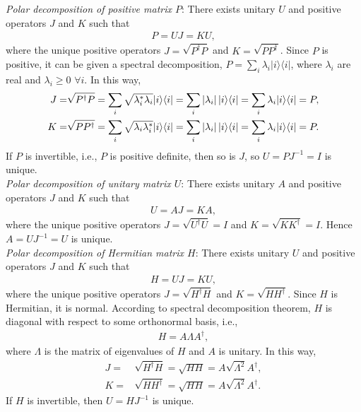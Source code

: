 \documentclass[en]{sol-man}
\begin{document}
\begin{sol}
    \emph{Polar decomposition of positive matrix $P$}: There exists unitary $U$ and positive operators $J$ and $K$ such that
    \begin{align}
        P=UJ=KU,
    \end{align}
    where the unique positive operators $J=\sqrt{P^{\dagger}P}$ and $K=\sqrt{PP^{\dagger}}$. Since $P$ is positive, it can be given a spectral decomposition, $P=\sum_i\lambda_i\lvert i\rangle\langle i\rvert$, where $\lambda_i$ are real and $\lambda_i\geq 0$ $\forall i$. In this way,
    \begin{align}
        J=&\sqrt{P^{\dagger}P}=\sum_i\sqrt{\lambda_i^*\lambda_i}\lvert i\rangle\langle i\rvert=\sum_i\left\lvert\lambda_i\right\rvert\lvert i\rangle\langle i\rvert=\sum_i\lambda_i\lvert i\rangle\langle i\rvert=P,\\
        K=&\sqrt{PP^{\dagger}}=\sum_i\sqrt{\lambda_i\lambda_i^*}\lvert i\rangle\langle i\rvert=\sum_i\left\lvert\lambda_i\right\rvert\lvert i\rangle\langle i\rvert=\sum_i\lambda_i\lvert i\rangle\langle i\rvert=P.
    \end{align}
    If $P$ is invertible, i.e., $P$ is positive definite, then so is $J$, so $U=PJ^{-1}=I$ is unique.\\
    \emph{Polar decomposition of unitary matrix $U$}: There exists unitary $A$ and positive operators $J$ and $K$ such that
    \begin{align}
        U=AJ=KA,
    \end{align}
    where the unique positive operators $J=\sqrt{U^{\dagger}U}=I$ and $K=\sqrt{KK^{\dagger}}=I$. Hence $A=UJ^{-1}=U$ is unique.\\
    \emph{Polar decomposition of Hermitian matrix $H$}: There exists unitary $U$ and positive operators $J$ and $K$ such that
    \begin{align}
        H=UJ=KU,
    \end{align}
    where the unique positive operators $J=\sqrt{H^{\dagger}H}$ and $K=\sqrt{HH^{\dagger}}$. Since $H$ is Hermitian, it is normal. According to spectral decomposition theorem, $H$ is diagonal with respect to some orthonormal basis, i.e.,
    \begin{align}
        H=A\Lambda A^{\dagger},
    \end{align}
    where $\Lambda$ is the matrix of eigenvalues of $H$ and $A$ is unitary. In this way,
    \begin{align}
        J=&\sqrt{H^{\dagger}H}=\sqrt{HH}=A\sqrt{\Lambda^2}A^{\dagger},\\
        K=&\sqrt{HH^{\dagger}}=\sqrt{HH}=A\sqrt{\Lambda^2}A^{\dagger}.
    \end{align}
    If $H$ is invertible, then $U=HJ^{-1}$ is unique.
\end{sol}
\end{document}
